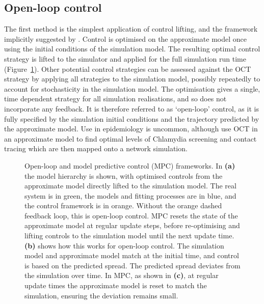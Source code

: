 \subsection{Open-loop control}

The first method is the simplest application of control lifting, and the framework implicitly suggested by \citet{an_optimization_2017}. Control is optimised on the approximate model once using the initial conditions of the simulation model. The resulting optimal control strategy is lifted to the simulator and applied for the full simulation run time (Figure~\ref{fig:ch4:mpc_framework}). Other potential control strategies can be assessed against the OCT strategy by applying all strategies to the simulation model, possibly repeatedly to account for stochasticity in the simulation model. The optimisation gives a single, time dependent strategy for all simulation realisations, and so does not incorporate any feedback. It is therefore referred to as `open-loop' control, as it is fully specified by the simulation initial conditions and the trajectory predicted by the approximate model. Use in epidemiology is uncommon, although \citet{clarke_approximating_2013} use OCT in an approximate model to find optimal levels of Chlamydia screening and contact tracing which are then mapped onto a network simulation.

\begin{figure}
    \begin{center}
    
        \caption[Open-loop and model predictive control frameworks]{Open-loop and model predictive control (MPC) frameworks. In \textbf{(a)} the model hierarchy is shown, with optimised controls from the approximate model directly lifted to the simulation model. The real system is in green, the models and fitting processes are in blue, and the control framework is in orange. Without the orange dashed feedback loop, this is open-loop control. MPC resets the state of the approximate model at regular update steps, before re-optimising and lifting controls to the simulation model until the next update time. \textbf{(b)} shows how this works for open-loop control. The simulation model and approximate model match at the initial time, and control is based on the predicted spread. The predicted spread deviates from the simulation over time. In MPC, as shown in \textbf{(c)}, at regular update times the approximate model is reset to match the simulation, ensuring the deviation remains small.
        \label{fig:ch4:mpc_framework}}
    \end{center}
\end{figure}

